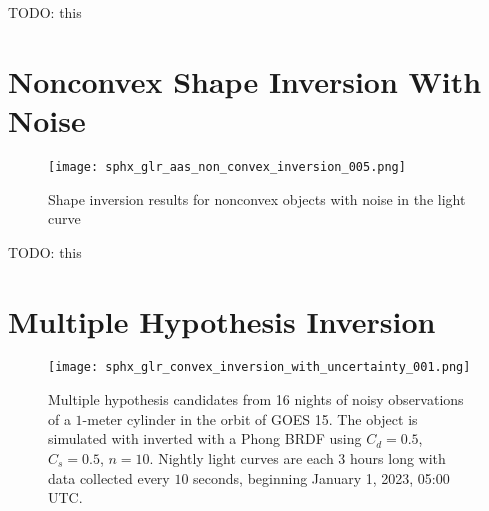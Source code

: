 TODO: this

\clearpage
\section{Nonconvex Shape Inversion With Noise}

\begin{figure}[!htb]
  \centering
  \texttt{[image: sphx\_glr\_aas\_non\_convex\_inversion\_005.png]}
  \caption{Shape inversion results for nonconvex objects with noise in the light curve}
  \label{fig:res_nonconvex_with_noise}
\end{figure}

TODO: this

\section{Multiple Hypothesis Inversion}

\begin{figure}[!htb]
    \centering
    \texttt{[image: sphx\_glr\_convex\_inversion\_with\_uncertainty\_001.png]}
    \caption{Multiple hypothesis candidates from 16 nights of noisy observations of a $1$-meter cylinder in the orbit of GOES 15. The object is simulated with inverted with a Phong BRDF using $C_d=0.5$, $C_s=0.5$, $n=10$. Nightly light curves are each $3$ hours long with data collected every $10$ seconds, beginning January 1, 2023, 05:00 UTC.}
    \label{fig:multi_hyp_candidates}
\end{figure}
